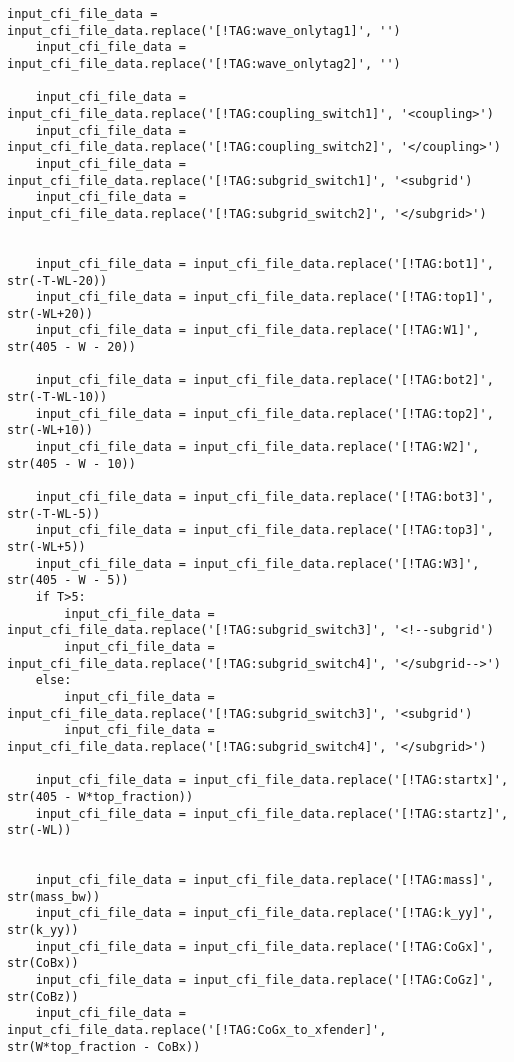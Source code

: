 \begin{mdframed}[backgroundcolor=light-gray, roundcorner=10pt,leftmargin=1, rightmargin=1, innerleftmargin=0, innertopmargin=7,innerbottommargin=0, outerlinewidth=1, linecolor=light-gray]
\begin{lstlisting}[linewidth=\columnwidth,caption= Script for creating comflow.cfi and  breakwater.in files ., label=script: creating comflow.cfi and breakwater.in]
    input_cfi_file_data = input_cfi_file_data.replace('[!TAG:wave_onlytag1]', '')
    input_cfi_file_data = input_cfi_file_data.replace('[!TAG:wave_onlytag2]', '')

    input_cfi_file_data = input_cfi_file_data.replace('[!TAG:coupling_switch1]', '<coupling>')
    input_cfi_file_data = input_cfi_file_data.replace('[!TAG:coupling_switch2]', '</coupling>')
    input_cfi_file_data = input_cfi_file_data.replace('[!TAG:subgrid_switch1]', '<subgrid')
    input_cfi_file_data = input_cfi_file_data.replace('[!TAG:subgrid_switch2]', '</subgrid>')


    input_cfi_file_data = input_cfi_file_data.replace('[!TAG:bot1]', str(-T-WL-20))
    input_cfi_file_data = input_cfi_file_data.replace('[!TAG:top1]', str(-WL+20))
    input_cfi_file_data = input_cfi_file_data.replace('[!TAG:W1]', str(405 - W - 20))

    input_cfi_file_data = input_cfi_file_data.replace('[!TAG:bot2]', str(-T-WL-10))
    input_cfi_file_data = input_cfi_file_data.replace('[!TAG:top2]', str(-WL+10))
    input_cfi_file_data = input_cfi_file_data.replace('[!TAG:W2]', str(405 - W - 10))

    input_cfi_file_data = input_cfi_file_data.replace('[!TAG:bot3]', str(-T-WL-5))
    input_cfi_file_data = input_cfi_file_data.replace('[!TAG:top3]', str(-WL+5))
    input_cfi_file_data = input_cfi_file_data.replace('[!TAG:W3]', str(405 - W - 5))
    if T>5:
        input_cfi_file_data = input_cfi_file_data.replace('[!TAG:subgrid_switch3]', '<!--subgrid')
        input_cfi_file_data = input_cfi_file_data.replace('[!TAG:subgrid_switch4]', '</subgrid-->')
    else:
        input_cfi_file_data = input_cfi_file_data.replace('[!TAG:subgrid_switch3]', '<subgrid')
        input_cfi_file_data = input_cfi_file_data.replace('[!TAG:subgrid_switch4]', '</subgrid>')

    input_cfi_file_data = input_cfi_file_data.replace('[!TAG:startx]', str(405 - W*top_fraction))
    input_cfi_file_data = input_cfi_file_data.replace('[!TAG:startz]', str(-WL))


    input_cfi_file_data = input_cfi_file_data.replace('[!TAG:mass]', str(mass_bw))
    input_cfi_file_data = input_cfi_file_data.replace('[!TAG:k_yy]', str(k_yy))
    input_cfi_file_data = input_cfi_file_data.replace('[!TAG:CoGx]', str(CoBx))
    input_cfi_file_data = input_cfi_file_data.replace('[!TAG:CoGz]', str(CoBz))
    input_cfi_file_data = input_cfi_file_data.replace('[!TAG:CoGx_to_xfender]', str(W*top_fraction - CoBx))


\end{lstlisting}
\end{mdframed}
